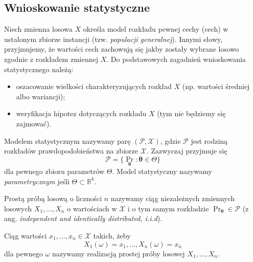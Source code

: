 \documentclass{myclass}
\numberwithin{equation}{subsection}
\begin{document}
\subsection{Wnioskowanie statystyczne}

Niech zmienna losowa \(X\) określa model rozkładu pewnej cechy (cech) w ustalonym zbiorze instancji
(tzw. \emph{populacji generalnej}). Innymi słowy, przyjmujemy, że wartości cech zachowują się jakby
zostały wybrane losowo zgodnie z rozkładem zmiennej \(X\). Do podstawowych zagadnień wnioskowania
statystycznego należą:
\begin{itemize}

    \item oszacowanie wielkości charakteryzujących rozkład \(X\) (np. wartości średniej albo
    wariancji);

    \item weryfikacja hipotez dotyczących rozkładu \(X\) (tym nie będziemy się zajmować).
    
\end{itemize}

\begin{definition}
Modelem statystycznym nazywamy parę \((\mathcal{P}, \mathcal{X})\), gdzie \(\mathcal{P}\) jest
rodziną rozkładów prawdopodobieństwa na zbiorze \(\mathcal{X}\). Zazwyczaj przyjmuje się
\begin{equation*}
    \mathcal{P} = \{\Pr_{\bm{\theta}} : \bm{\theta} \in \Theta \} 
\end{equation*}
dla pewnego zbioru parametrów \(\Theta\). Model statystyczny nazywamy \emph{parametrycznym} jeśli
\(\Theta \subset \mathbb{R}^k\).
\end{definition}

\begin{definition}
Prostą próbą losową o liczności \(n\) nazywamy ciąg niezależnych zmiennych losowych
\(X_1,\ldots,X_n\) o wartościach w \(\mathcal{X}\) i o tym samym rozkładzie \(\Pr_{\bm{\theta}} \in
\mathcal{P}\) (z ang. \textit{independent and identically distributed, i.i.d}).
\end{definition}

\begin{definition}
Ciąg wartości \(x_1,\ldots,x_n \in \mathcal{X}\) takich, żeby
\begin{equation*}
    X_1(\omega) = x_1,\ldots,X_n(\omega) = x_n
\end{equation*}
dla pewnego \(\omega\) nazywamy realizacją prostej próby losowej \(X_1,\ldots,X_n\).
\end{definition}
\end{document}

